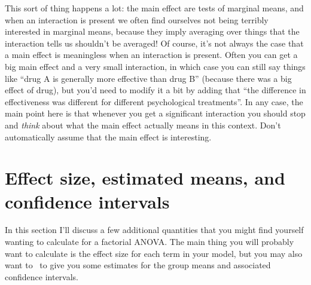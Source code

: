 This sort of thing happens a lot: the main effect are tests of marginal means, and when an interaction is present we often find ourselves not being terribly interested in marginal means, because they imply averaging over things that the interaction tells us shouldn't be averaged! Of course, it's not always the case that a main effect is meaningless when an interaction is present. Often you can get a big main effect and a very small interaction, in which case you can still say things like ``drug A is generally more effective than drug B'' (because there was a big effect of drug), but you'd need to modify it a bit by adding that ``the difference in effectiveness was different for different psychological treatments''. In any case, the main point here is that whenever you get a significant interaction you should stop and {\it think} about what the main effect actually means in this context. Don't automatically assume that the main effect is interesting. 


\section{Effect size, estimated means, and confidence intervals\label{sec:effectsizefactorialanova}}

In this section I'll discuss a few additional quantities that you might find yourself wanting to calculate for a factorial ANOVA. The main thing you will probably want to calculate is the effect size for each term in your model, but you may also want to \R\ to give you some estimates for the group means and associated confidence intervals. 



